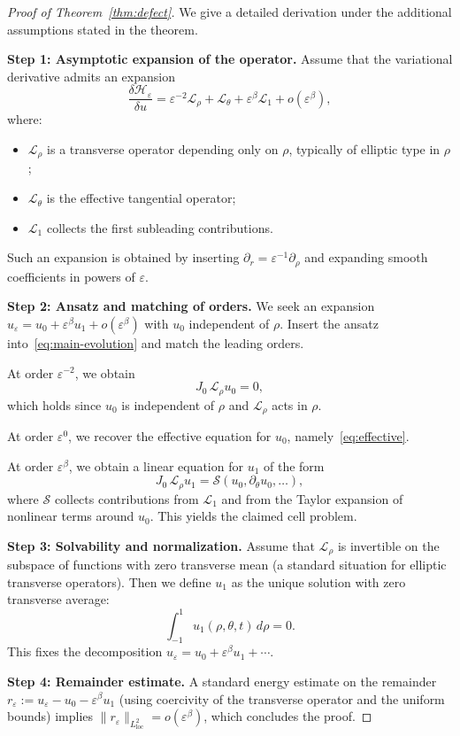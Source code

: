 \documentclass[11pt]{amsart}
\theoremstyle{plain}
\theoremstyle{definition}
\theoremstyle{remark}
\theoremstyle{remark}
\begin{document}
\begin{proof}[Proof of Theorem~\ref{thm:defect}]
We give a detailed derivation under the additional assumptions stated in the theorem.

\smallskip
\noindent\textbf{Step 1: Asymptotic expansion of the operator.}
Assume that the variational derivative admits an expansion
\[
\frac{\delta\mathcal H_\varepsilon}{\delta u}
=
\varepsilon^{-2}\mathcal L_\rho
+\mathcal L_\theta
+\varepsilon^\beta \mathcal L_1
+o(\varepsilon^\beta),
\]
where:
\begin{itemize}
\item \(\mathcal L_\rho\) is a transverse operator depending only on \(\rho\),
typically of elliptic type in \(\rho\);
\item \(\mathcal L_\theta\) is the effective tangential operator;
\item \(\mathcal L_1\) collects the first subleading contributions.
\end{itemize}
Such an expansion is obtained by inserting \(\partial_r=\varepsilon^{-1}\partial_\rho\)
and expanding smooth coefficients in powers of \(\varepsilon\).

\smallskip
\noindent\textbf{Step 2: Ansatz and matching of orders.}
We seek an expansion
\(
u_\varepsilon=u_0+\varepsilon^\beta u_1+o(\varepsilon^\beta)
\)
with \(u_0\) independent of \(\rho\).
Insert the ansatz into~\eqref{eq:main-evolution} and match the leading orders.

At order \(\varepsilon^{-2}\), we obtain
\[
J_0\,\mathcal L_\rho u_0 = 0,
\]
which holds since \(u_0\) is independent of \(\rho\) and \(\mathcal L_\rho\) acts
in \(\rho\).

At order \(\varepsilon^{0}\), we recover the effective equation for \(u_0\),
namely~\eqref{eq:effective}.

At order \(\varepsilon^\beta\), we obtain a linear equation for \(u_1\) of the form
\[
J_0\,\mathcal L_\rho u_1
=
\mathcal S(u_0,\partial_\theta u_0,\ldots),
\]
where \(\mathcal S\) collects contributions from \(\mathcal L_1\) and from the
Taylor expansion of nonlinear terms around \(u_0\).
This yields the claimed cell problem.

\smallskip
\noindent\textbf{Step 3: Solvability and normalization.}
Assume that \(\mathcal L_\rho\) is invertible on the subspace of functions
with zero transverse mean (a standard situation for elliptic transverse operators).
Then we define \(u_1\) as the unique solution with zero transverse average:
\[
\int_{-1}^1 u_1(\rho,\theta,t)\,d\rho = 0.
\]
This fixes the decomposition \(u_\varepsilon=u_0+\varepsilon^\beta u_1+\cdots\).

\smallskip
\noindent\textbf{Step 4: Remainder estimate.}
A standard energy estimate on the remainder
\(r_\varepsilon:=u_\varepsilon-u_0-\varepsilon^\beta u_1\)
(using coercivity of the transverse operator and the uniform bounds)
implies
\(
\|r_\varepsilon\|_{L^2_{\mathrm{loc}}}=o(\varepsilon^\beta)
\),
which concludes the proof.
\end{proof}
\end{document}
